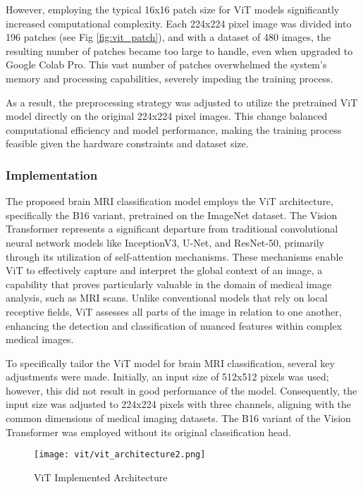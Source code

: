 However, employing the typical 16x16 patch size for ViT models \cite{Wang2021Not} significantly increased computational complexity. Each 224x224 pixel image was divided into 196 patches (see Fig \ref{fig:vit_patch}), and with a dataset of 480 images, the resulting number of patches became too large to handle, even when upgraded to Google Colab Pro. This vast number of patches overwhelmed the system's memory and processing capabilities, severely impeding the training process.

As a result, the preprocessing strategy was adjusted to utilize the pretrained ViT model directly on the original 224x224 pixel images. This change balanced computational efficiency and model performance, making the training process feasible given the hardware constraints and dataset size.


\subsubsection{Implementation}

The proposed brain MRI classification model employs the ViT architecture, specifically the B16 variant, pretrained on the ImageNet dataset. The Vision Transformer represents a significant departure from traditional convolutional neural network models like InceptionV3, U-Net, and ResNet-50, primarily through its utilization of self-attention mechanisms. These mechanisms enable ViT to effectively capture and interpret the global context of an image, a capability that proves particularly valuable in the domain of medical image analysis, such as MRI scans. Unlike conventional models that rely on local receptive fields, ViT assesses all parts of the image in relation to one another, enhancing the detection and classification of nuanced features within complex medical images.

To specifically tailor the ViT model for brain MRI classification, several key adjustments were made. Initially, an input size of 512x512 pixels was used; however, this did not result in good performance of the model. Consequently, the input size was adjusted to 224x224 pixels with three channels, aligning with the common dimensions of medical imaging datasets. The B16 variant of the Vision Transformer was employed without its original classification head. 

\begin{figure}[H]
  \centering
  \texttt{[image: vit/vit\_architecture2.png]}
  \caption{ViT Implemented Architecture}
  \label{fig:vit_implemented_architecture}
\end{figure}


